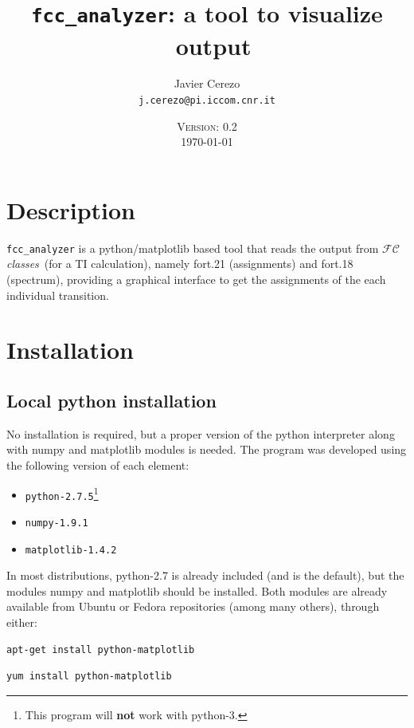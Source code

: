 \documentclass[a4paper,11pt]{article}
\title{\texttt{fcc\_analyzer}: a tool to visualize \fcc\ output}
\date{\textsc{Version: 0.2}\\\today}
\author{Javier Cerezo\\\texttt{j.cerezo@pi.iccom.cnr.it}}
\begin{document}
\newcommand{\fcc}{$\mathcal{FC}$\textit{classes}}

\maketitle

\section{Description}
\texttt{fcc\_analyzer} is a python/matplotlib based tool that reads the output from \fcc\ (for a TI calculation), namely fort.21 (assignments) and fort.18 (spectrum), providing a graphical interface to get the assignments of the each individual transition.

\section{Installation}

\subsection{Local python installation}
No installation is required, but a proper version of the python interpreter along with numpy and matplotlib modules is needed. The program was developed using the following version of each element:

\begin{itemize}
 \item \texttt{python-2.7.5}\footnote{This program will \textbf{not} work with python-3.}
 \item \texttt{numpy-1.9.1}
 \item \texttt{matplotlib-1.4.2}
\end{itemize}

In most distributions, python-2.7 is already included (and is the default), but the modules numpy and matplotlib should be installed. Both modules are already available from Ubuntu or Fedora repositories (among many others), through either:

\begin{minipage}{0.5\textwidth}
 \begin{lstlisting}[label=ubuntu_repo,caption=\texttt{matplotlib} from Ubuntu]
apt-get install python-matplotlib
 \end{lstlisting}
\end{minipage}
\hspace*{0.1cm}
\begin{minipage}{0.45\textwidth}
  \begin{lstlisting}[label=fedora_repo,caption=\texttt{matplotlib} from Fedora]
yum install python-matplotlib
 \end{lstlisting}
\end{minipage}
\end{document}
